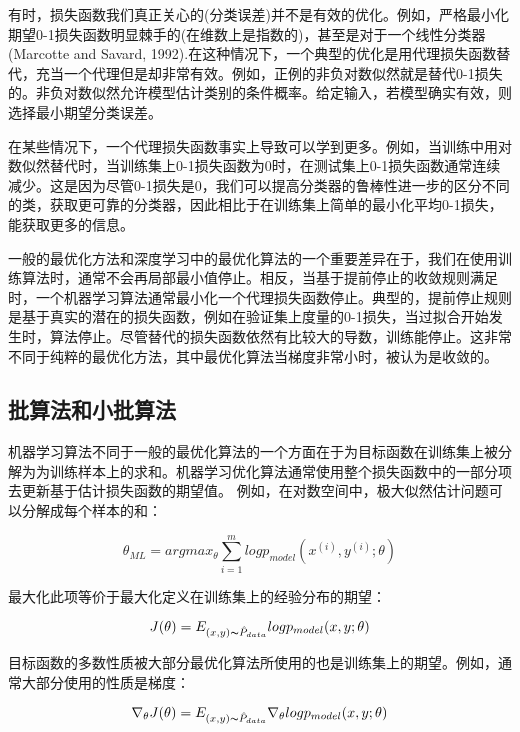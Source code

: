 有时，损失函数我们真正关心的(分类误差)并不是有效的优化。例如，严格最小化期望0-1损失函数明显棘手的(在维数上是指数的)，甚至是对于一个线性分类器(Marcotte and Savard, 1992).在这种情况下，一个典型的优化是用代理损失函数替代，充当一个代理但是却非常有效。例如，正例的非负对数似然就是替代0-1损失的。非负对数似然允许模型估计类别的条件概率。给定输入，若模型确实有效，则选择最小期望分类误差。

在某些情况下，一个代理损失函数事实上导致可以学到更多。例如，当训练中用对数似然替代时，当训练集上0-1损失函数为0时，在测试集上0-1损失函数通常连续减少。这是因为尽管0-1损失是0，我们可以提高分类器的鲁棒性进一步的区分不同的类，获取更可靠的分类器，因此相比于在训练集上简单的最小化平均0-1损失，能获取更多的信息。

一般的最优化方法和深度学习中的最优化算法的一个重要差异在于，我们在使用训练算法时，通常不会再局部最小值停止。相反，当基于提前停止的收敛规则满足时，一个机器学习算法通常最小化一个代理损失函数停止。典型的，提前停止规则是基于真实的潜在的损失函数，例如在验证集上度量的0-1损失，当过拟合开始发生时，算法停止。尽管替代的损失函数依然有比较大的导数，训练能停止。这非常不同于纯粹的最优化方法，其中最优化算法当梯度非常小时，被认为是收敛的。

\subsection{批算法和小批算法}

机器学习算法不同于一般的最优化算法的一个方面在于为目标函数在训练集上被分解为为训练样本上的求和。机器学习优化算法通常使用整个损失函数中的一部分项去更新基于估计损失函数的期望值。
例如，在对数空间中，极大似然估计问题可以分解成每个样本的和：

\begin{equation}
\theta_{ML}=argmax_\theta\sum_{i=1}^m log p_{model}(x^{(i)},y^{(i)};\theta)
\end{equation}

最大化此项等价于最大化定义在训练集上的经验分布的期望：

\begin{equation}
J(\theta)=E_{(x,y)\thicksim\hat{P}_{data}} log p_{model}(x,y;\theta)
\end{equation}

目标函数的多数性质被大部分最优化算法所使用的也是训练集上的期望。例如，通常大部分使用的性质是梯度：

\begin{equation}
\nabla_{\theta}J(\theta)=E_{(x,y)\thicksim\hat{P}_{data}}\nabla_{\theta} log p_{model}(x,y;\theta)
\end{equation}

